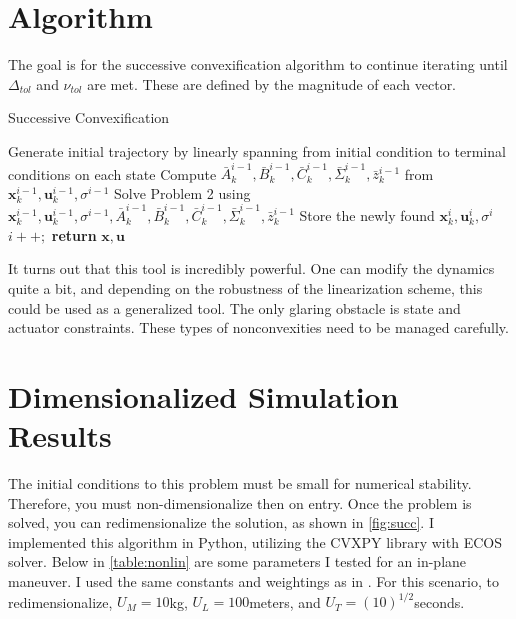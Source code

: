 \clearpage
\section{Algorithm}
The goal is for the successive convexification algorithm to continue iterating until $\Delta_{tol}$ and $\nu_{tol}$ are met. These are defined by the magnitude of each vector.

\begin{algorithm}
\caption{Successive Convexification}\label{Successive}
\begin{algorithmic}[1]
\State Generate initial trajectory by linearly spanning from initial condition to terminal conditions on each state
\State Compute $\bar{A}_k^{i-1}, \bar{B}_k^{i-1}, \bar{C}_k^{i-1}, \bar{\Sigma}_k^{i-1}, \bar{z}_k^{i-1}$ from $\mathbf{x}_k^{i-1}, \mathbf{u}_k^{i-1}, \sigma^{i-1}$
\State Solve Problem 2 using $\mathbf{x}_k^{i-1}, \mathbf{u}_k^{i-1}, \sigma^{i-1}, \bar{A}_k^{i-1}, \bar{B}_k^{i-1}, \bar{C}_k^{i-1}, \bar{\Sigma}_k^{i-1}, \bar{z}_k^{i-1}$
\State Store the newly found $\mathbf{x}_k^{i}, \mathbf{u}_k^{i}, \sigma^{i}$
\State $i++;$
\EndWhile 
\State \textbf{return} $\mathbf{x}, \mathbf{u}$
\EndProcedure
\end{algorithmic}
\end{algorithm}



It turns out that this tool is incredibly powerful. One can modify the dynamics quite a bit, and depending on the robustness of the linearization scheme, this could be used as a generalized tool. The only glaring obstacle is state and actuator constraints. These types of nonconvexities need to be managed carefully.



\section{Dimensionalized Simulation Results}
The initial conditions to this problem must be small for numerical stability. Therefore, you must non-dimensionalize then on entry. Once the problem is solved, you can redimensionalize the solution, as shown in \ref{fig:succ}. I implemented this algorithm in Python, utilizing the CVXPY library with ECOS solver. Below in \ref{table:nonlin} are some parameters I tested for an in-plane maneuver. I used the same constants and weightings as in \cite{6dofsucc}. For this scenario, to redimensionalize, $U_M = 10$kg, $U_L=100$meters, and $U_T = (10)^{1/2}$seconds.

